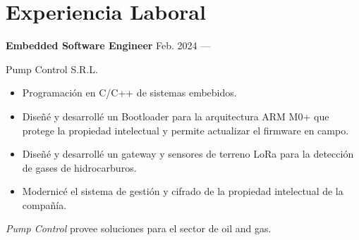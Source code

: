 \section{Experiencia Laboral}

\parbox[t][][t]{\linewidth}{
	\parbox{\linewidth}{
		\textbf{Embedded Software Engineer}
			\hfill
			{Feb. 2024 --- \phantom{Dec. 2099}}
		}
	\smallbreak
	\parbox{\linewidth}{Pump Control S.R.L.}
	\smallbreak
		\begin{itemize}
			\item{Programación en C/C++ de sistemas embebidos.}
			\item{Diseñé y desarrollé un Bootloader para la arquitectura ARM M0+ que protege la propiedad intelectual y permite actualizar el firmware en campo.}
			\item{Diseñé y desarrollé un gateway y sensores de terreno LoRa para la detección de gases de hidrocarburos.}
			\item{Modernicé el sistema de gestión y cifrado de la propiedad intelectual de la compañía.}
		\end{itemize}
	\smallbreak
    \emph{Pump Control} provee soluciones para el sector de oil and gas.
}

